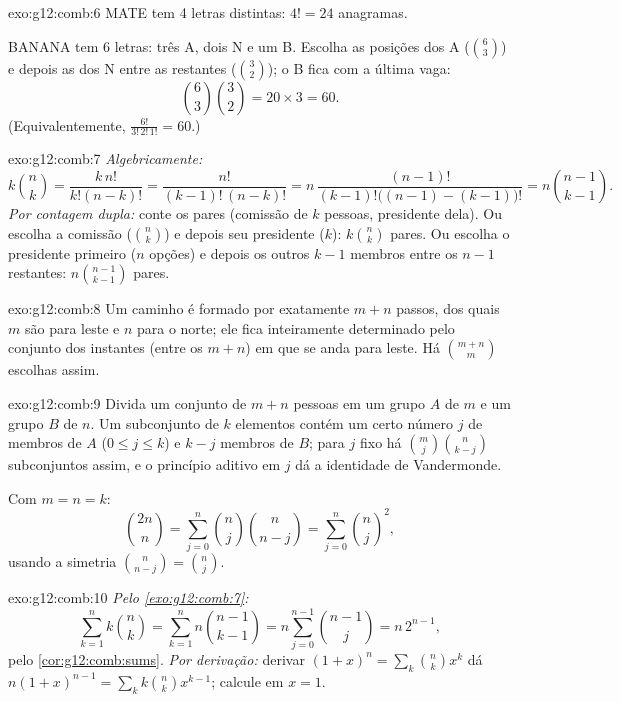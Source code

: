 \begin{solution}{exo:g12:comb:6}
MATE tem 4 letras distintas: $4! = 24$ anagramas.

BANANA tem 6 letras: três A, dois N e um B. Escolha as posições dos A
($\binom63$) e depois as dos N entre as restantes ($\binom32$); o B fica
com a última vaga:
\[
\binom{6}{3}\binom{3}{2} = 20 \times 3 = 60 .
\]
(Equivalentemente, $\frac{6!}{3!\,2!\,1!} = 60$.)
\end{solution}

\begin{solution}{exo:g12:comb:7}
\emph{Algebricamente:}
\[
k\binom nk = \frac{k\,n!}{k!(n-k)!} = \frac{n!}{(k-1)!\,(n-k)!}
= n\,\frac{(n-1)!}{(k-1)!\bigl((n-1)-(k-1)\bigr)!} = n\binom{n-1}{k-1}.
\]
\emph{Por contagem dupla:} conte os pares (comissão de $k$ pessoas,
presidente dela). Ou escolha a comissão ($\binom nk$) e depois seu
presidente ($k$): $k\binom nk$ pares. Ou escolha o presidente primeiro
($n$ opções) e depois os outros $k-1$ membros entre os $n-1$ restantes:
$n\binom{n-1}{k-1}$ pares.
\end{solution}

\begin{solution}{exo:g12:comb:8}
Um caminho é formado por exatamente $m + n$ passos, dos quais $m$ são para
leste e $n$ para o norte; ele fica inteiramente determinado pelo conjunto
dos instantes (entre os $m+n$) em que se anda para leste. Há
$\binom{m+n}{m}$ escolhas assim.
\end{solution}

\begin{solution}{exo:g12:comb:9}
Divida um conjunto de $m + n$ pessoas em um grupo $A$ de $m$ e um grupo $B$
de $n$. Um subconjunto de $k$ elementos contém um certo número $j$ de
membros de $A$ ($0 \leq j \leq k$) e $k - j$ membros de $B$; para $j$ fixo
há $\binom mj \binom{n}{k-j}$ subconjuntos assim, e o princípio aditivo em
$j$ dá a identidade de Vandermonde.

Com $m = n = k$:
\[
\binom{2n}{n} = \sum_{j=0}^n \binom nj \binom{n}{n-j}
= \sum_{j=0}^n \binom nj^{2},
\]
usando a simetria $\binom{n}{n-j} = \binom nj$.
\end{solution}

\begin{solution}{exo:g12:comb:10}
\emph{Pelo \cref{exo:g12:comb:7}:}
\[
\sum_{k=1}^n k\binom nk = \sum_{k=1}^n n\binom{n-1}{k-1}
= n\sum_{j=0}^{n-1}\binom{n-1}{j} = n\,2^{n-1},
\]
pelo \cref{cor:g12:comb:sums}. \emph{Por derivação:} derivar
$(1+x)^n = \sum_k \binom nk x^k$ dá
$n(1+x)^{n-1} = \sum_k k \binom nk x^{k-1}$; calcule em $x = 1$.
\end{solution}

